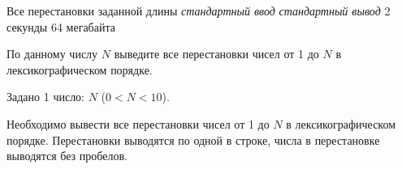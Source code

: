 \begin{problem}%
{Все перестановки заданной длины}%
{\textsl{стандартный ввод}}%
{\textsl{стандартный вывод}}%
{2 секунды}%
{64 мегабайта}{}

По данному числу $N$ выведите все перестановки чисел от 1 до $N$ в лексикографическом порядке.

\InputFile

Задано 1 число: $N$ ($0 < N < 10$).

\OutputFile

Необходимо вывести все перестановки чисел от 1 до $N$ в лексикографическом порядке. Перестановки выводятся по одной в строке, числа в перестановке выводятся без пробелов.

\Examples

\begin{example}
%
\end{example}
\end{problem}